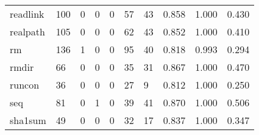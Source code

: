 \begin{longtable}{lp{1.3cm}p{1.3cm}p{1.3cm}p{1.3cm}p{1.3cm}p{1.3cm}p{1.3cm}p{1.3cm}p{1.3cm}}
readlink  &                    100 &                                             0 &                                            0 &                                           0 &                                           57 &                                         43 &                                0.858 &                                  1.000 &                                0.430 \\
realpath  &                    105 &                                             0 &                                            0 &                                           0 &                                           62 &                                         43 &                                0.852 &                                  1.000 &                                0.410 \\
rm        &                    136 &                                             1 &                                            0 &                                           0 &                                           95 &                                         40 &                                0.818 &                                  0.993 &                                0.294 \\
rmdir     &                     66 &                                             0 &                                            0 &                                           0 &                                           35 &                                         31 &                                0.867 &                                  1.000 &                                0.470 \\
runcon    &                     36 &                                             0 &                                            0 &                                           0 &                                           27 &                                          9 &                                0.812 &                                  1.000 &                                0.250 \\
seq       &                     81 &                                             0 &                                            1 &                                           0 &                                           39 &                                         41 &                                0.870 &                                  1.000 &                                0.506 \\
sha1sum   &                     49 &                                             0 &                                            0 &                                           0 &                                           32 &                                         17 &                                0.837 &                                  1.000 &                                0.347 \\

\end{longtable}

